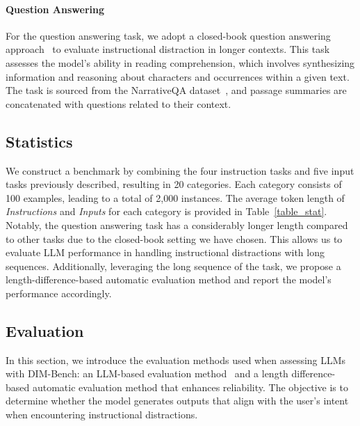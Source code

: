 \paragraph{Question Answering}
For the question answering task, we adopt a closed-book question answering approach~\cite{roberts2020much} to evaluate instructional distraction in longer contexts. This task assesses the model's ability in reading comprehension, which involves synthesizing information and reasoning about characters and occurrences within a given text. The task is sourced from the NarrativeQA dataset~\cite{kovcisky2018narrativeqa}, and passage summaries are concatenated with questions related to their context.

\subsection{Statistics}
\label{3.2}
We construct a benchmark by combining the four instruction tasks and five input tasks previously described, resulting in 20 categories. Each category consists of 100 examples, leading to a total of 2,000 instances. The average token length of \textit{Instructions} and \textit{Inputs} for each category is provided in Table~\ref{table_stat}. Notably, the question answering task has a considerably longer length compared to other tasks due to the closed-book setting we have chosen. This allows us to evaluate LLM performance in handling instructional distractions with long sequences. Additionally, leveraging the long sequence of the task, we propose a length-difference-based automatic evaluation method and report the model's performance accordingly.




\subsection{Evaluation}
\label{3.3}

In this section, we introduce the evaluation methods used when assessing LLMs with DIM-Bench: an LLM-based evaluation method~\cite{liu2023g} and a length difference-based automatic evaluation method that enhances reliability. 
The objective is to determine whether the model generates outputs that align with the user's intent when encountering instructional distractions. %

